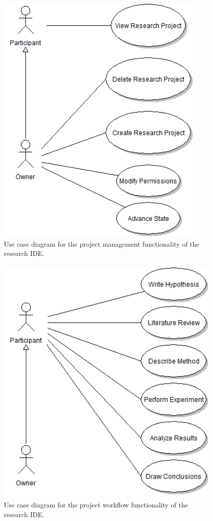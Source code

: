 \documentclass[document.tex]{subfiles}
\begin{document}
\begin{figure}[!ht]
\centering \includegraphics[height=5in]{./img/case-study-research-railgun/project_management_use_case}
\caption{Use case diagram for the project management functionality of the research IDE.}
\label{fig:case-research-use-case-project-management}
\end{figure}

\begin{figure}[!ht]
\centering \includegraphics[height=5in]{./img/case-study-research-railgun/project_workflow_use_case}
\caption{Use case diagram for the project workflow functionality of the research IDE.}
\label{fig:case-research-use-case-project-workflow}
\end{figure}
\end{document}
